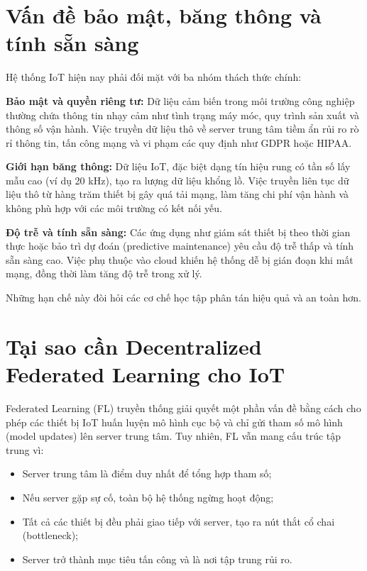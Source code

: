 \section{Vấn đề bảo mật, băng thông và tính sẵn sàng}

\hspace{0.6cm}Hệ thống IoT hiện nay phải đối mặt với ba nhóm thách thức chính:

\textbf{Bảo mật và quyền riêng tư: }Dữ liệu cảm biến trong môi trường công nghiệp thường chứa thông tin nhạy cảm như tình trạng máy móc, quy trình sản xuất và thông số vận hành. Việc truyền dữ liệu thô về server trung tâm tiềm ẩn rủi ro rò rỉ thông tin, tấn công mạng và vi phạm các quy định như GDPR hoặc HIPAA.

\textbf{Giới hạn băng thông: }
Dữ liệu IoT, đặc biệt dạng tín hiệu rung có tần số lấy mẫu cao (ví dụ 20 kHz), tạo ra lượng dữ liệu khổng lồ. Việc truyền liên tục dữ liệu thô từ hàng trăm thiết bị gây quá tải mạng, làm tăng chi phí vận hành và không phù hợp với các môi trường có kết nối yếu.

\textbf{Độ trễ và tính sẵn sàng:}
Các ứng dụng như giám sát thiết bị theo thời gian thực hoặc bảo trì dự đoán (predictive maintenance) yêu cầu độ trễ thấp và tính sẵn sàng cao. Việc phụ thuộc vào cloud khiến hệ thống dễ bị gián đoạn khi mất mạng, đồng thời làm tăng độ trễ trong xử lý.

Những hạn chế này đòi hỏi các cơ chế học tập phân tán hiệu quả và an toàn hơn.

\section{Tại sao cần Decentralized Federated Learning cho IoT}

\hspace{0.6cm}Federated Learning (FL) truyền thống giải quyết một phần vấn đề bằng cách cho phép các thiết bị IoT huấn luyện mô hình cục bộ và chỉ gửi tham số mô hình (model updates) lên server trung tâm. Tuy nhiên, FL vẫn mang cấu trúc tập trung vì:

\begin{itemize}
    \item Server trung tâm là điểm duy nhất để tổng hợp tham số;
    \item Nếu server gặp sự cố, toàn bộ hệ thống ngừng hoạt động;
    \item Tất cả các thiết bị đều phải giao tiếp với server, tạo ra nút thắt cổ chai (bottleneck);
    \item Server trở thành mục tiêu tấn công và là nơi tập trung rủi ro.
\end{itemize}

